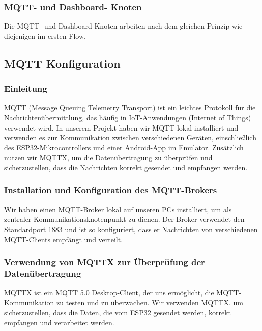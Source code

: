 \documentclass[conference,a4paper,flushend]{cs-techrep}
\begin{document}
\subsubsection{MQTT- und Dashboard- Knoten}
Die MQTT- und Dashboard-Knoten arbeiten nach dem gleichen Prinzip wie diejenigen im ersten Flow. 

\subsection{MQTT Konfiguration}
\subsubsection{Einleitung}
MQTT (Message Queuing Telemetry Transport) ist ein leichtes Protokoll für die Nachrichtenübermittlung, das häufig in IoT-Anwendungen (Internet of Things) verwendet wird. In unserem Projekt haben wir MQTT lokal installiert und verwenden es zur Kommunikation zwischen verschiedenen Geräten, einschließlich des ESP32-Mikrocontrollers und einer Android-App im Emulator. Zusätzlich nutzen wir MQTTX, um die Datenübertragung zu überprüfen und sicherzustellen, dass die Nachrichten korrekt gesendet und empfangen werden.

\subsubsection{Installation und Konfiguration des MQTT-Brokers}
Wir haben einen MQTT-Broker lokal auf unseren PCs installiert, um als zentraler Kommunikationsknotenpunkt zu dienen. Der Broker verwendet den Standardport 1883 und ist so konfiguriert, dass er Nachrichten von verschiedenen MQTT-Clients empfängt und verteilt. \vspace{0.5em}

\subsubsection{Verwendung von MQTTX zur Überprüfung der Datenübertragung}
MQTTX ist ein MQTT 5.0 Desktop-Client, der uns ermöglicht, die MQTT-Kommunikation zu testen und zu überwachen. Wir verwenden MQTTX, um sicherzustellen, dass die Daten, die vom ESP32 gesendet werden, korrekt empfangen und verarbeitet werden. \vspace{0.5em}
\end{document}

